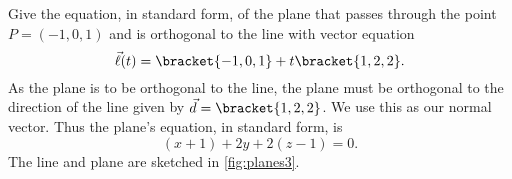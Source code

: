 \begin{example}\label{ex_planes3}%
Give the equation, in standard form, of the plane that passes through the point $P=(-1,0,1)$ and is orthogonal to the line with vector equation
\[\vec \ell(t) =\bracket{-1,0,1}+ t\bracket{1,2,2}.\]
\solution
As the plane is to be orthogonal to the line, the plane must be orthogonal to the direction of the line given by $\vec d =\bracket{1,2,2}$. We use this as our normal vector. Thus the plane's equation, in standard form, is
\[(x+1) +2y+2(z-1)=0.\]
The line and plane are sketched in \autoref{fig:planes3}.
\end{example}

